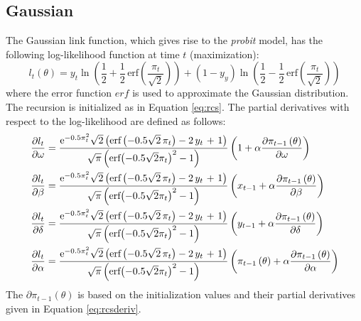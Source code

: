 \subsection{Gaussian}
The Gaussian link function, which gives rise to the \emph{probit} model, has the following log-likelihood function at time $t$ (maximization):
\begin{equation}
{l_t}\left( \theta  \right) = {y_t}\ln \left( {\frac{1}
{2} + \frac{1}
{2}\,{\text{erf}}\left( {\frac{{{\pi _t}}}
{{\sqrt 2 }}} \right)} \right) + \left( {1 - {y_y}} \right)\ln \left( {\frac{1}
{2} - \frac{1}
{2}\,{\text{erf}}\left( {\frac{{{\pi _t}}}
{{\sqrt 2 }}} \right)} \right)
\end{equation}
where the error function $erf$ is used to approximate the Gaussian distribution. The recursion is initialized as in Equation \ref{eq:rcs}. The partial derivatives with respect to the log-likelihood are defined as follows:
\begin{equation}
\begin{gathered}
  \frac{{\partial {l_t}}}
{{\partial \omega }} = \frac{{{{\text{e}}^{ - 0.5\pi _t^2}}\sqrt 2 \left( {{\text{erf}}\left( { - 0.5\sqrt 2 \,{\pi _t}} \right) - 2\,{y_t}{\text{ + }}1} \right)}}
{{\sqrt {\mathbf{\pi }} \left( {{\text{erf}}{{\left( { - 0.5\sqrt 2 {\pi _t}} \right)}^2} - 1} \right)}}\left( {1 + \alpha \frac{{\partial {\pi _{t - 1}}\left( \theta  \right)}}
{{\partial \omega }}} \right) \hfill \\
  \frac{{\partial {l_t}}}
{{\partial \beta }} = \frac{{{{\text{e}}^{ - 0.5\pi _t^2}}\sqrt 2 \left( {{\text{erf}}\left( { - 0.5\sqrt 2 \,{\pi _t}} \right) - 2\,{y_t}{\text{ + }}1} \right)}}
{{\sqrt {\mathbf{\pi }} \left( {{\text{erf}}{{\left( { - 0.5\sqrt 2 {\pi _t}} \right)}^2} - 1} \right)}}\left( {{x_{t - 1}} + \alpha \frac{{\partial {\pi _{t - 1}}\left( \theta  \right)}}
{{\partial \beta }}} \right) \hfill \\
  \frac{{\partial {l_t}}}
{{\partial \delta }} = \frac{{{{\text{e}}^{ - 0.5\pi _t^2}}\sqrt 2 \left( {{\text{erf}}\left( { - 0.5\sqrt 2 \,{\pi _t}} \right) - 2\,{y_t}{\text{ + }}1} \right)}}
{{\sqrt {\mathbf{\pi }} \left( {{\text{erf}}{{\left( { - 0.5\sqrt 2 {\pi _t}} \right)}^2} - 1} \right)}}\left( {{y_{t - 1}} + \alpha \frac{{\partial {\pi _{t - 1}}\left( \theta  \right)}}
{{\partial \delta }}} \right) \hfill \\
  \frac{{\partial {l_t}}}
{{\partial \alpha }} = \frac{{{{\text{e}}^{ - 0.5\pi _t^2}}\sqrt 2 \left( {{\text{erf}}\left( { - 0.5\sqrt 2 \,{\pi _t}} \right) - 2\,{y_t}{\text{ + }}1} \right)}}
{{\sqrt {\mathbf{\pi }} \left( {{\text{erf}}{{\left( { - 0.5\sqrt 2 {\pi _t}} \right)}^2} - 1} \right)}}\left( {{\pi _{t - 1}}\left( \theta  \right) + \alpha \frac{{\partial {\pi _{t - 1}}\left( \theta  \right)}}
{{\partial \alpha }}} \right) \hfill \\
\end{gathered}
\end{equation}
The ${\partial {\pi _{t - 1}}\left( \theta  \right)}$ is based on the initialization values and their partial derivatives given in Equation \ref{eq:rcsderiv}.

